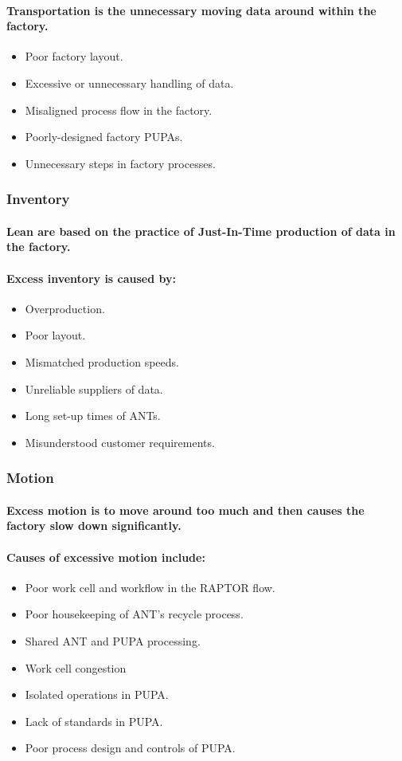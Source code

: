 \documentclass{acm_proc_article-sp}
\begin{document}
\paragraph{Transportation is the unnecessary moving data around within the factory.}
\begin{itemize}
\item Poor factory layout.
\item Excessive or unnecessary handling of data.
\item Misaligned process flow in the factory.
\item Poorly-designed factory PUPAs.
\item Unnecessary steps in factory processes.
\end{itemize}
\subsubsection{Inventory}
\paragraph{Lean are based on the practice of Just-In-Time production of data in the factory.}
\paragraph{Excess inventory is caused by:}
\begin{itemize}
\item Overproduction.
\item Poor layout.
\item Mismatched production speeds.
\item Unreliable suppliers of data.
\item Long set-up times of ANTs.
\item Misunderstood customer requirements.
\end{itemize}
\subsubsection{Motion}
\paragraph{Excess motion is to move around too much and then causes the factory slow down significantly.}
\paragraph{Causes of excessive motion include:}
\begin{itemize}
\item Poor work cell and workflow in the RAPTOR flow.
\item Poor housekeeping of ANT's recycle process.
\item Shared ANT and PUPA processing.
\item Work cell congestion
\item Isolated operations in PUPA.
\item Lack of standards in PUPA.
\item Poor process design and controls of PUPA.
\end{itemize}
\end{document}
